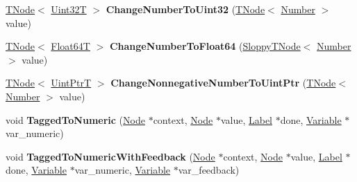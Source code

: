 \begin{DoxyCompactItemize}
\item 
\mbox{\label{classv8_1_1internal_1_1CodeStubAssembler_a924b8246acd322ada9c86f3b885fd9a5}} 
\mbox{\hyperlink{classv8_1_1internal_1_1compiler_1_1TNode}{T\+Node}}$<$ \mbox{\hyperlink{structv8_1_1internal_1_1Uint32T}{Uint32T}} $>$ {\bfseries Change\+Number\+To\+Uint32} (\mbox{\hyperlink{classv8_1_1internal_1_1compiler_1_1TNode}{T\+Node}}$<$ \mbox{\hyperlink{structv8_1_1internal_1_1UnionT}{Number}} $>$ value)
\item 
\mbox{\label{classv8_1_1internal_1_1CodeStubAssembler_a91d93cdb2e90b140aad306823e1d5ad1}} 
\mbox{\hyperlink{classv8_1_1internal_1_1compiler_1_1TNode}{T\+Node}}$<$ \mbox{\hyperlink{structv8_1_1internal_1_1Float64T}{Float64T}} $>$ {\bfseries Change\+Number\+To\+Float64} (\mbox{\hyperlink{classv8_1_1internal_1_1compiler_1_1SloppyTNode}{Sloppy\+T\+Node}}$<$ \mbox{\hyperlink{structv8_1_1internal_1_1UnionT}{Number}} $>$ value)
\item 
\mbox{\label{classv8_1_1internal_1_1CodeStubAssembler_a553cd01fabcc0a5506bd0ab7e76efd7e}} 
\mbox{\hyperlink{classv8_1_1internal_1_1compiler_1_1TNode}{T\+Node}}$<$ \mbox{\hyperlink{structv8_1_1internal_1_1UintPtrT}{Uint\+PtrT}} $>$ {\bfseries Change\+Nonnegative\+Number\+To\+Uint\+Ptr} (\mbox{\hyperlink{classv8_1_1internal_1_1compiler_1_1TNode}{T\+Node}}$<$ \mbox{\hyperlink{structv8_1_1internal_1_1UnionT}{Number}} $>$ value)
\item 
\mbox{\label{classv8_1_1internal_1_1CodeStubAssembler_a3cbd9e0e8659b2e9b09535bb8eb002fe}} 
void {\bfseries Tagged\+To\+Numeric} (\mbox{\hyperlink{classv8_1_1internal_1_1compiler_1_1Node}{Node}} $\ast$context, \mbox{\hyperlink{classv8_1_1internal_1_1compiler_1_1Node}{Node}} $\ast$value, \mbox{\hyperlink{classv8_1_1internal_1_1compiler_1_1CodeAssemblerLabel}{Label}} $\ast$done, \mbox{\hyperlink{classv8_1_1internal_1_1compiler_1_1CodeAssemblerVariable}{Variable}} $\ast$var\+\_\+numeric)
\item 
\mbox{\label{classv8_1_1internal_1_1CodeStubAssembler_afbbfb4e8ea6a5f48acbee01e858d2a6a}} 
void {\bfseries Tagged\+To\+Numeric\+With\+Feedback} (\mbox{\hyperlink{classv8_1_1internal_1_1compiler_1_1Node}{Node}} $\ast$context, \mbox{\hyperlink{classv8_1_1internal_1_1compiler_1_1Node}{Node}} $\ast$value, \mbox{\hyperlink{classv8_1_1internal_1_1compiler_1_1CodeAssemblerLabel}{Label}} $\ast$done, \mbox{\hyperlink{classv8_1_1internal_1_1compiler_1_1CodeAssemblerVariable}{Variable}} $\ast$var\+\_\+numeric, \mbox{\hyperlink{classv8_1_1internal_1_1compiler_1_1CodeAssemblerVariable}{Variable}} $\ast$var\+\_\+feedback)

\end{DoxyCompactItemize}

